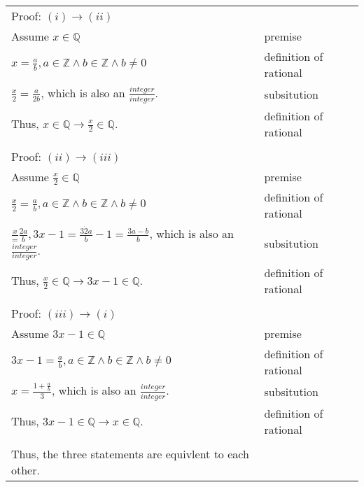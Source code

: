 \documentclass[12pt]{exam}
\begin{document}
\begin{solution}
	\begin{tabular}{ll}
		Proof: $(i) \rightarrow (ii)$                                                                                                                  \\
		Assume $x \in \mathbb{Q} $                                                                                            & premise                \\
		$x= \frac{a}{b}, a \in \mathbb{Z} \land b \in \mathbb{Z} \land b \neq 0$                                              & definition of rational \\
		$\frac {x}{2}= \frac {a}{2b}$, which is also an $\frac {integer}{integer}$.                                           & subsitution            \\
		Thus, $x \in \mathbb{Q} \rightarrow \frac {x}{2} \in \mathbb{Q}$.                                                     & definition of rational \\\\
		Proof: $(ii) \rightarrow (iii)$                                                                                                                \\
		Assume $\frac {x}{2} \in \mathbb{Q} $                                                                                 & premise                \\
		$\frac {x}{2}= \frac{a}{b}, a \in \mathbb{Z} \land b \in \mathbb{Z} \land b \neq 0$                                   & definition of rational \\
		$\frac {x}= \frac {2a}{b}, 3x-1=\frac {3 \dot 2a}{b}-1=\frac {3a-b}{b}$, which is also an $\frac {integer}{integer}$. & subsitution            \\
		Thus, $\frac {x}{2} \in \mathbb{Q} \rightarrow 3x-1 \in \mathbb{Q}$.                                                  & definition of rational \\\\

		Proof: $(iii) \rightarrow (i)$                                                                                                                 \\
		Assume $3x-1 \in \mathbb{Q} $                                                                                         & premise                \\
		$3x-1= \frac{a}{b}, a \in \mathbb{Z} \land b \in \mathbb{Z} \land b \neq 0$                                           & definition of rational \\
		$x= \frac {1+\frac {a}{b}}{3}$, which is also an $\frac {integer}{integer}$.                                          & subsitution            \\
		Thus, $3x-1 \in \mathbb{Q} \rightarrow x \in \mathbb{Q}$.                                                             & definition of rational \\\\


		Thus, the three statements are equivlent to each other.
	\end{tabular}
\end{solution}
\end{document}
